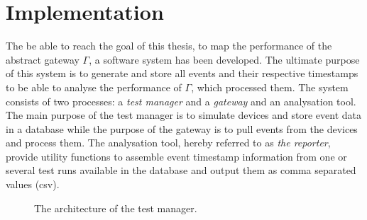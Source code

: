 \chapter{Implementation}

The be able to reach the goal of this thesis, to map the performance of the
abstract gateway $\Gamma$, a software system has been developed. The ultimate
purpose of this system is to generate and store all events and their respective
timestamps to be able to analyse the performance of $\Gamma$, which processed
them. The system consists of two processes: a \textit{test manager} and a
\textit{gateway} and an analysation tool. The main purpose of the test manager
is to simulate devices and store event data in a database while the purpose of
the gateway is to pull events from the devices and process them. The
analysation tool, hereby referred to as \textit{the reporter}, provide utility
functions to assemble event timestamp information from one or several test runs
available in the database and output them as comma separated values (csv).

\begin{figure}[h!]
    \centering
    \caption{The architecture of the test manager.}
    \label{fig:test_manager_impl_architecture}
\end{figure}

